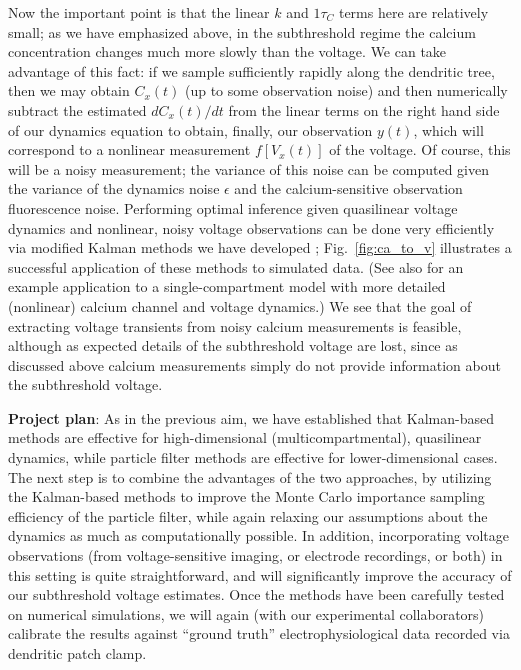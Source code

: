 \documentclass[12pt]{article}
\begin{document}
Now the important point is that the linear $k$ and $1\tau_C$ terms
here are relatively small; as we have emphasized above, in the
subthreshold regime the calcium concentration changes much more slowly
than the voltage.  We can take advantage of this fact: if we sample
sufficiently rapidly along the dendritic tree, then we may obtain
$C_x(t)$ (up to some observation noise) and then numerically subtract
the estimated $dC_x(t)/dt$ from the linear terms on the right hand
side of our dynamics equation to obtain, finally, our observation
$y(t)$, which will correspond to a nonlinear measurement $f[V_x(t)]$
of the voltage.  Of course, this will be a noisy measurement; the
variance of this noise can be computed given the variance of the
dynamics noise $\epsilon$ and the calcium-sensitive observation
fluorescence noise.  Performing optimal inference given quasilinear
voltage dynamics and nonlinear, noisy voltage observations can be done
very efficiently via modified Kalman methods we have developed
\cite{PanBook,Vogelstein08}; Fig.~\ref{fig:ca_to_v} illustrates a
successful application of these methods to simulated data.  (See also
\cite{HP06} for an example application to a single-compartment model
with more detailed (nonlinear) calcium channel and voltage dynamics.)
We see that the goal of extracting voltage transients from noisy
calcium measurements is feasible, although as expected details of the
subthreshold voltage are lost, since as discussed above calcium
measurements simply do not provide information about the subthreshold
voltage.

\noindent \textbf{Project plan}: As in the previous aim, we have
established that Kalman-based methods are effective for
high-dimensional (multicompartmental), quasilinear dynamics, while
particle filter methods are effective for lower-dimensional cases.
The next step is to combine the advantages of the two approaches, by
utilizing the Kalman-based methods to improve the Monte Carlo
importance sampling efficiency of the particle filter, while again
relaxing our assumptions about the dynamics as much as computationally
possible.  In addition, incorporating voltage observations (from
voltage-sensitive imaging, or electrode recordings, or both) in this
setting is quite straightforward, and will significantly improve the
accuracy of our subthreshold voltage estimates.  Once the methods have
been carefully tested on numerical simulations, we will again (with
our experimental collaborators) calibrate the results against ``ground
truth'' electrophysiological data recorded via dendritic patch clamp.
\end{document}
